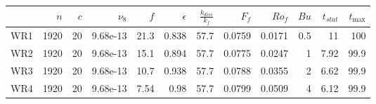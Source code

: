 \documentclass[a4paper]{article}
\begin{document}
\begin{tabular}{lrrrrrrrrrrr}
\toprule
{} &   $n$ &  $c$ &  $\nu_8$ &  $f$ &  $\epsilon$ &  $\frac{k_{diss}}{k_f}$ &  $F_f$ &  $Ro_f$ &  $Bu$ &  $t_{stat}$ &  $t_{\max}$ \\
\midrule
WR1 &  1920 &   20 & 9.68e-13 & 21.3 &       0.838 &                    57.7 & 0.0759 &  0.0171 &   0.5 &          11 &         100 \\
WR2 &  1920 &   20 & 9.68e-13 & 15.1 &       0.894 &                    57.7 & 0.0775 &  0.0247 &     1 &        7.92 &        99.9 \\
WR3 &  1920 &   20 & 9.68e-13 & 10.7 &       0.938 &                    57.7 & 0.0788 &  0.0355 &     2 &        6.62 &        99.9 \\
WR4 &  1920 &   20 & 9.68e-13 & 7.54 &        0.98 &                    57.7 & 0.0799 &  0.0509 &     4 &        6.12 &        99.9 \\
\bottomrule
\end{tabular}
\end{document}
